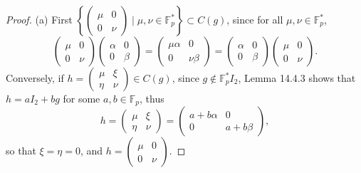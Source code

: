 \documentclass[11pt,a4paper]{article}
\newcommand{\F}{\mathbb{F}}
\begin{document}
{\begin{proof}
\item[(a)] First $\left\{ \begin{pmatrix} \mu & 0 \\ 0 & \nu \end{pmatrix} \mid \mu,\nu \in \F_p^*\right\} \subset C(g)$, since for all $\mu,\nu \in \F_p^*$,
$$ \begin{pmatrix} \mu & 0 \\ 0 & \nu \end{pmatrix}\begin{pmatrix} \alpha & 0 \\ 0 & \beta \end{pmatrix}
= \begin{pmatrix} \mu\alpha & 0 \\ 0 & \nu\beta \end{pmatrix}
=\begin{pmatrix} \alpha & 0 \\ 0 & \beta \end{pmatrix}\begin{pmatrix} \mu & 0 \\ 0 & \nu \end{pmatrix}.$$
Conversely, if $h =  \begin{pmatrix} \mu & \xi \\ \eta & \nu \end{pmatrix} \in C(g)$, since $g\not \in \F_p^*I_2$, Lemma 14.4.3 shows that $h = aI_2+bg$ for some $a,b \in \F_p$, thus 
$$h =  \begin{pmatrix} \mu & \xi \\ \eta & \nu \end{pmatrix} =  \begin{pmatrix} a + b\alpha & 0 \\ 0 & a + b \beta \end{pmatrix},$$
so that $\xi = \eta = 0$, and $h =  \begin{pmatrix} \mu & 0 \\ 0 & \nu \end{pmatrix}$.


\end{proof}}
\end{document}
